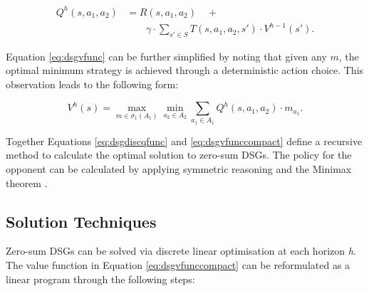 {\small 
\abovedisplayskip=0pt
\belowdisplayskip=0pt
\begin{align}
\label{eq:dsgdiscqfunc}
  Q^{h}(s, a_1, a_2) & = R(s, a_1, a_2) \quad + \nonumber \\
  & \qquad \gamma \cdot \sum_{s' \in S} T(s, a_1, a_2, s') \cdot V^{h-1}(s').
\end{align}
}%

Equation \eqref{eq:dsgvfunc} can be further simplified by noting that given any $m$, the 
optimal minimum strategy is achieved through a deterministic action choice. This observation 
leads to the following form:

{\small 
\abovedisplayskip=0pt
\belowdisplayskip=0pt
\begin{equation}
\label{eq:dsgvfunccompact}
  V^{h}(s) = \max_{m \in \sigma_1(A_1)} \min_{a_2 \in A_2} \sum_{a_1 \in A_1} Q^{h}(s, a_1, a_2) \cdot m_{a_1}.
\end{equation}
}%

Together Equations \eqref{eq:dsgdiscqfunc} and \eqref{eq:dsgvfunccompact}
define a recursive method to calculate the optimal solution to zero-sum DSGs. The 
policy for the opponent can be calculated by applying symmetric reasoning and the 
Minimax theorem \cite{Neumann_MA_1928}. 

\subsection{Solution Techniques}
\label{subsec:dsgsolution}

Zero-sum DSGs can be solved via discrete linear optimisation at each horizon \textit{h}. The value
function in Equation \eqref{eq:dsgvfunccompact} can be reformulated as a linear
program through the following steps:

